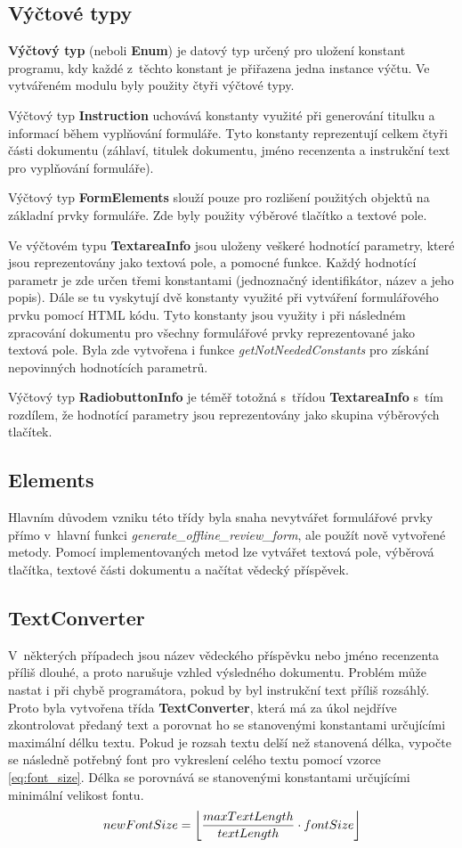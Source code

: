\subsection{Výčtové typy}
\textbf{Výčtový typ} (neboli \textbf{Enum}) je datový typ určený pro uložení konstant programu, kdy každé z~těchto konstant je přiřazena jedna instance výčtu. Ve vytvářeném modulu byly použity čtyři výčtové typy. 
\par
Výčtový typ \textbf{Instruction} uchovává konstanty využité při generování titulku a informací během vyplňování formuláře. Tyto konstanty reprezentují celkem čtyři části dokumentu (záhlaví, titulek dokumentu, jméno recenzenta a instrukční text pro vyplňování formuláře).
\par
Výčtový typ \textbf{FormElements} slouží pouze pro rozlišení použitých objektů na základní prvky formuláře. Zde byly použity výběrové tlačítko a textové pole.
\par
Ve výčtovém typu \textbf{TextareaInfo} jsou uloženy veškeré hodnotící parametry, které jsou reprezentovány jako textová pole, a pomocné funkce. Každý hodnotící parametr je zde určen třemi konstantami (jednoznačný identifikátor, název a jeho popis). Dále se tu vyskytují dvě konstanty využité při vytváření formulářového prvku pomocí HTML kódu. Tyto konstanty jsou využity i při následném zpracování dokumentu pro všechny formulářové prvky reprezentované jako textová pole. Byla zde vytvořena i funkce \textit{getNotNeededConstants} pro získání nepovinných hodnotících parametrů.
\par
Výčtový typ \textbf{RadiobuttonInfo} je téměř totožná s~třídou \textbf{TextareaInfo} s~tím rozdílem, že hodnotící parametry jsou reprezentovány jako skupina výběrových tlačítek.
\subsection{Elements}
Hlavním důvodem vzniku této třídy byla snaha nevytvářet formulářové prvky přímo v~hlavní funkci \textit{generate\_offline\_review\_form}, ale použít nově vytvořené metody. Pomocí implementovaných metod lze vytvářet textová pole, výběrová tlačítka, textové části dokumentu a načítat vědecký příspěvek.
\subsection{TextConverter}
V~některých případech jsou název vědeckého příspěvku nebo jméno recenzenta příliš dlouhé, a proto narušuje vzhled výsledného dokumentu. Problém může nastat i při chybě programátora, pokud by byl instrukční text příliš rozsáhlý. Proto byla vytvořena třída \textbf{TextConverter}, která má za úkol nejdříve zkontrolovat předaný text a porovnat ho se stanovenými konstantami určujícími maximální délku textu. Pokud je rozsah textu delší než stanovená délka, vypočte se následně potřebný font pro vykreslení celého textu pomocí vzorce \eqref{eq:font_size}. Délka se porovnává se stanovenými konstantami určujícími minimální velikost fontu. 
\begin{equation}
newFontSize = \floor*{\frac{maxTextLength}{textLength} \cdot fontSize} \label{eq:font_size}
\end{equation}


